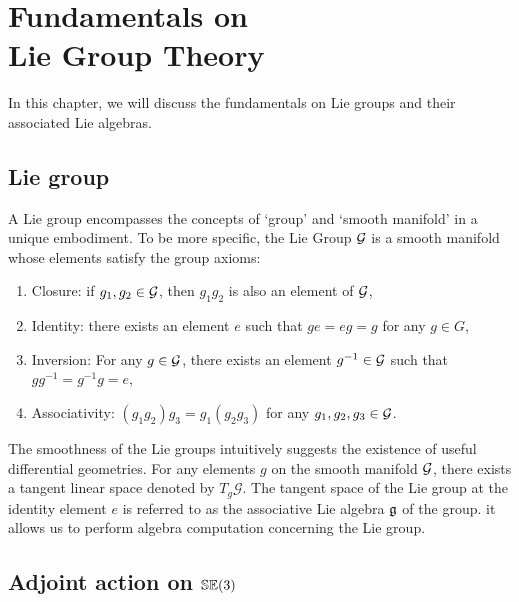 \chapter{Fundamentals on \\ \vspace{5mm} Lie Group Theory}
In this chapter, we will discuss the fundamentals on Lie groups and their associated Lie algebras.

\section{Lie group}
A Lie group encompasses the concepts of `group' and `smooth manifold' in a unique embodiment. To be more specific, the Lie Group $\mathcal{G}$ is a smooth manifold whose elements satisfy the group axioms:
\begin{enumerate}
\item Closure: if $g_1,g_2 \in \mathcal{G}$, then $g_1g_2$ is also an element of $\mathcal{G}$,
\item Identity: there exists an element $e$ such that $g e = e g = g$ for any $g \in G$,
\item Inversion: For any $g \in \mathcal{G}$, there exists an element $g^{-1} \in \mathcal{G}$ such that $g g^{-1} = g^{-1}g = e$,
\item Associativity: $(g_1 g_2) g_3 = g_1 (g_2 g_3)$ for any $g_1,g_2,g_3 \in \mathcal{G}$.
\end{enumerate}

The smoothness of the Lie groups intuitively suggests the existence of useful differential geometries. For any elements $g$ on the smooth manifold $\mathcal{G}$, there exists a tangent linear space denoted by $T_{g} \mathcal{G}$. The tangent space of the Lie group at the identity element $e$ is referred to as the associative Lie algebra $\mathfrak{g}$ of the group. it allows us to perform algebra computation concerning the Lie group.

\section{Adjoint action on ${\mathbb{SE}(3)}$}